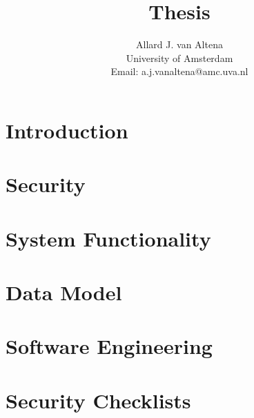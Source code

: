 \documentclass[a4paper]{report}
\title{Thesis}
\author{
	Allard J. van Altena\\
	University of Amsterdam\\
	Email: a.j.vanaltena@amc.uva.nl
}
\newif\ifstructure
\begin{document}
	
	
	\chapter{Introduction}
	\label{introduction}
	
	\ifstructure
		
	\else
		
	\fi

	\chapter{Security}
	\label{security}
	
	\ifstructure
		
	\else
		
		
		
	\fi
	
	\chapter{System Functionality}
	\label{system-functionality}
	
	\ifstructure
			
	\else
		
		
	\fi
	
	\chapter{Data Model}
	\label{datamodel}
	
	\ifstructure
		
	\else
		
		
	\fi
	
	\chapter{Software Engineering}
	\label{engineering}
	
	\ifstructure
			
	\else
		
	\fi
	
	\clearpage
	
	
	\appendix
	\chapter{Security Checklists}
	\label{security-appendix}
	
	\ifstructure
	\else 
		
	\fi
\end{document}
